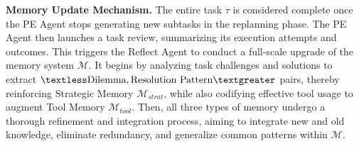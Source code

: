 \textbf{Memory Update Mechanism.}
The entire task $\tau$ is considered complete once the PE Agent stops generating new subtasks in the replanning phase. The PE Agent then launches a task review, summarizing its execution attempts and outcomes. This triggers the Reflect Agent to conduct a full-scale upgrade of the memory system $\mathcal{M}$. It begins by analyzing task challenges and solutions to extract $\textless \text{Dilemma}, \text{Resolution Pattern} \textgreater$ pairs, thereby reinforcing Strategic Memory $\mathcal{M}_{strat}$, while also codifying effective tool usage to augment Tool Memory $\mathcal{M}_{tool}$. Then, all three types of memory undergo a thorough refinement and integration process, aiming to integrate new and old knowledge, eliminate redundancy, and generalize common patterns within $\mathcal{M}$.
